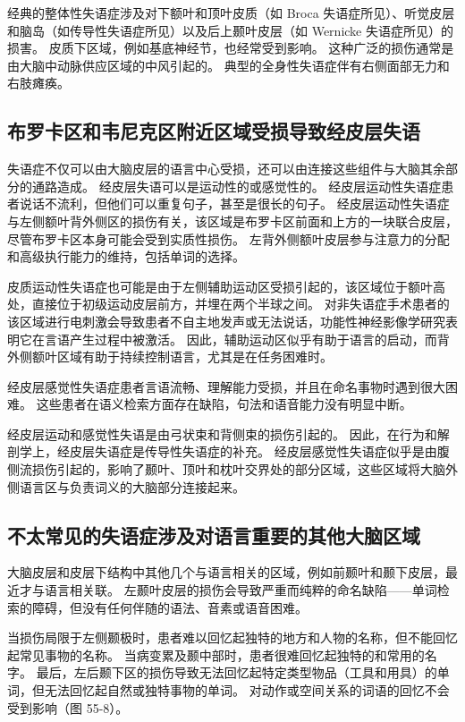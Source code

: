 经典的整体性失语症涉及对下额叶和顶叶皮质（如 Broca 失语症所见）、听觉皮层和脑岛（如传导性失语症所见）以及后上颞叶皮层（如 Wernicke 失语症所见）的损害。 皮质下区域，例如基底神经节，也经常受到影响。 这种广泛的损伤通常是由大脑中动脉供应区域的中风引起的。 典型的全身性失语症伴有右侧面部无力和右肢瘫痪。

\subsection{布罗卡区和韦尼克区附近区域受损导致经皮层失语}

失语症不仅可以由大脑皮层的语言中心受损，还可以由连接这些组件与大脑其余部分的通路造成。 经皮层失语可以是运动性的或感觉性的。 经皮层运动性失语症患者说话不流利，但他们可以重复句子，甚至是很长的句子。 经皮层运动性失语症与左侧额叶背外侧区的损伤有关，该区域是布罗卡区前面和上方的一块联合皮层，尽管布罗卡区本身可能会受到实质性损伤。 左背外侧额叶皮层参与注意力的分配和高级执行能力的维持，包括单词的选择。

皮质运动性失语症也可能是由于左侧辅助运动区受损引起的，该区域位于额叶高处，直接位于初级运动皮层前方，并埋在两个半球之间。 对非失语症手术患者的该区域进行电刺激会导致患者不自主地发声或无法说话，功能性神经影像学研究表明它在言语产生过程中被激活。 因此，辅助运动区似乎有助于语言的启动，而背外侧额叶区域有助于持续控制语言，尤其是在任务困难时。


经皮层感觉性失语症患者言语流畅、理解能力受损，并且在命名事物时遇到很大困难。 这些患者在语义检索方面存在缺陷，句法和语音能力没有明显中断。

经皮层运动和感觉性失语是由弓状束和背侧束的损伤引起的。 因此，在行为和解剖学上，经皮层失语症是传导性失语症的补充。 经皮层感觉性失语症似乎是由腹侧流损伤引起的，影响了颞叶、顶叶和枕叶交界处的部分区域，这些区域将大脑外侧语言区与负责词义的大脑部分连接起来。

\subsection{不太常见的失语症涉及对语言重要的其他大脑区域}

大脑皮层和皮层下结构中其他几个与语言相关的区域，例如前颞叶和颞下皮层，最近才与语言相关联。 左颞叶皮层的损伤会导致严重而纯粹的命名缺陷——单词检索的障碍，但没有任何伴随的语法、音素或语音困难。

当损伤局限于左侧颞极时，患者难以回忆起独特的地方和人物的名称，但不能回忆起常见事物的名称。 当病变累及颞中部时，患者很难回忆起独特的和常用的名字。 最后，左后颞下区的损伤导致无法回忆起特定类型物品（工具和用具）的单词，但无法回忆起自然或独特事物的单词。 对动作或空间关系的词语的回忆不会受到影响（图 55-8）。

